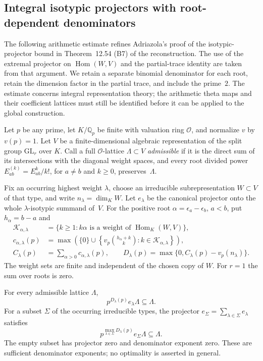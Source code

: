 \subsection{Integral isotypic projectors with root-dependent denominators}
\label{integral-isotypic-projector-section}

The following arithmetic estimate refines Adriazola's proof of the
isotypic-projector bound in Theorem~12.54 (B7) of the reconstruction.
The use of the extremal projector on $\operatorname{Hom}(W,V)$ and the
partial-trace identity are taken from that argument.
\cite{adriazola-reconstruction}
We retain a separate binomial denominator for each root, retain the
dimension factor in the partial trace, and include the prime~$2$.
The estimate concerns integral representation theory; the arithmetic
theta maps and their coefficient lattices must still be identified
before it can be applied to the global construction.

Let $p$ be any prime, let $K/\mathbb Q_p$ be finite with valuation
ring $\mathcal O$, and normalize $v$ by $v(p)=1$.  Let $V$ be a
finite-dimensional algebraic representation of the split group
$\mathrm{GL}_r$ over $K$.  Call a full $\mathcal O$-lattice
$\Lambda\subset V$ \emph{admissible} if it is the direct sum of
its intersections with the diagonal weight spaces, and every root
divided power $E_{ab}^{(k)}=E_{ab}^k/k!$, for $a\ne b$ and $k\ge0$,
preserves~$\Lambda$.

Fix an occurring highest weight $\lambda$, choose an irreducible
subrepresentation $W\subset V$ of that type, and write
$n_\lambda=\dim_K W$.  Let $e_\lambda$ be the canonical projector
onto the whole $\lambda$-isotypic summand of~$V$.  For the positive
root $\alpha=\epsilon_a-\epsilon_b$, $a<b$, put $h_\alpha=b-a$ and
\begin{align*}
 \mathcal K_{\alpha,\lambda}
   &=\{k\ge1:k\alpha\text{ is a weight of }
                         \operatorname{Hom}_K(W,V)\},\\
 c_{\alpha,\lambda}(p)
   &=\max\left(\{0\}\cup
       \left\{v_p\binom{h_\alpha+k}{k}:
                       k\in\mathcal K_{\alpha,\lambda}\right\}\right),\\
 C_\lambda(p)&=\sum_{\alpha>0}c_{\alpha,\lambda}(p),
 \qquad
 D_\lambda(p)=\max\{0,C_\lambda(p)-v_p(n_\lambda)\}.
\end{align*}
The weight sets are finite and independent of the chosen copy of $W$.
For $r=1$ the sum over roots is zero.

\begin{theorem}
\label{integral-isotypic-projector-theorem}
For every admissible lattice $\Lambda$,
\[
             p^{D_\lambda(p)}e_\lambda\Lambda\subseteq\Lambda.
\]
For a subset $\Sigma$ of the occurring irreducible types, the projector
$e_\Sigma=\sum_{\lambda\in\Sigma}e_\lambda$ satisfies
\[
       p^{\max_{\lambda\in\Sigma}D_\lambda(p)}e_\Sigma\Lambda
                  \subseteq\Lambda.
\]
The empty subset has projector zero and denominator exponent zero.
These are sufficient denominator exponents; no optimality is asserted
in general.
\end{theorem}


